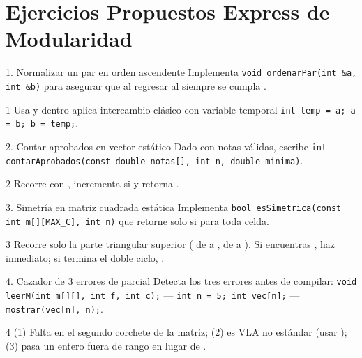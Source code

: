 \documentclass[11pt,letterpaper]{article}
\begin{document}
\clearpage
\section{Ejercicios Propuestos Express de Modularidad}

\begin{ejercicio}[top=2mm,bottom=2mm,before skip=5pt,after skip=4pt]{1. Normalizar un par en orden ascendente}
Implementa \texttt{void ordenarPar(int \&a, int \&b)} para asegurar que al regresar al  siempre se cumpla .
\end{ejercicio}
\begin{solucion}[top=2mm,bottom=2mm,before skip=3pt,after skip=6pt]{1}
Usa  y dentro aplica intercambio clásico con variable temporal \texttt{int temp = a; a = b; b = temp;}.
\end{solucion}

\begin{ejercicio}[top=2mm,bottom=2mm,before skip=5pt,after skip=4pt]{2. Contar aprobados en vector estático}
Dado  con  notas válidas, escribe \texttt{int contarAprobados(const double notas[], int n, double minima)}.
\end{ejercicio}
\begin{solucion}[top=2mm,bottom=2mm,before skip=3pt,after skip=6pt]{2}
Recorre con , incrementa  si  y retorna .
\end{solucion}

\begin{ejercicio}[top=2mm,bottom=2mm,before skip=5pt,after skip=4pt]{3. Simetría en matriz cuadrada estática}
Implementa \texttt{bool esSimetrica(const int m[][MAX\_C], int n)} que retorne  solo si  para toda celda.
\end{ejercicio}
\begin{solucion}[top=2mm,bottom=2mm,before skip=3pt,after skip=6pt]{3}
Recorre solo la parte triangular superior ( de  a ,  de  a ). Si encuentras , haz  inmediato; si termina el doble ciclo, .
\end{solucion}

\begin{ejercicio}[top=2mm,bottom=2mm,before skip=5pt,after skip=4pt]{4. Cazador de 3 errores de parcial}
Detecta los tres errores antes de compilar: \texttt{void leerM(int m[][], int f, int c);} --- \texttt{int n = 5; int vec[n];} --- \texttt{mostrar(vec[n], n);}.
\end{ejercicio}
\begin{solucion}[top=2mm,bottom=2mm,before skip=3pt,after skip=4pt]{4}
(1) Falta  en el segundo corchete de la matriz; (2)  es VLA no estándar (usar ); (3)  pasa un entero fuera de rango en lugar de .
\end{solucion}
\end{document}
